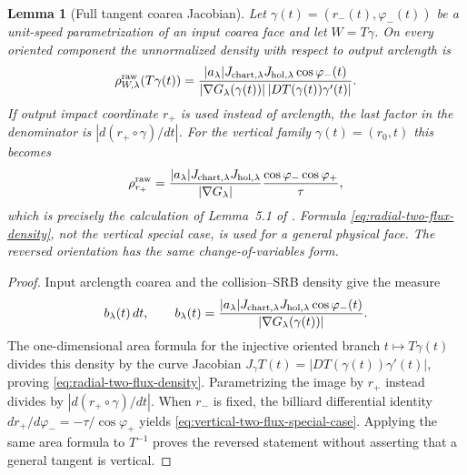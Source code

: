 \documentclass[11pt]{article}
\newtheorem{lemma}[theorem]{Lemma}
\begin{document}
\begin{lemma}[Full tangent coarea Jacobian]
\label{lem:two-flux-coarea}
Let $\gamma(t)=(r_-(t),\varphi_-(t))$ be a unit-speed parametrization of an
input coarea face and let $W=T\gamma$.  On every oriented component the
unnormalized density with respect to output arclength is
\begin{equation}
\label{eq:radial-two-flux-density}
 \rho^{\rm raw}_{W,\lambda}(T\gamma(t))=
 \frac{|a_\lambda|J_{{\rm chart},\lambda}J_{{\rm hol},\lambda}
       \cos\varphi_-(t)}
 {|\nabla G_\lambda(\gamma(t))|\,
       |D T(\gamma(t))\gamma'(t)|}.
\end{equation}
If output impact coordinate $r_+$ is used instead of arclength, the last
factor in the denominator is $|d(r_+\circ\gamma)/dt|$.  For the vertical
family $\gamma(t)=(r_0,t)$ this becomes
\begin{equation}
\label{eq:vertical-two-flux-special-case}
 \rho^{\rm raw}_{r_+}=
 \frac{|a_\lambda|J_{{\rm chart},\lambda}J_{{\rm hol},\lambda}}
 {|\nabla G_\lambda|}\frac{\cos\varphi_-\cos\varphi_+}{\tau},
\end{equation}
which is precisely the calculation of Lemma~5.1 of
\cite{CanestrariHoles}.  Formula \eqref{eq:radial-two-flux-density}, not the
vertical special case, is used for a general physical face.  The reversed
orientation has the same change-of-variables form.
\end{lemma}

\begin{proof}
Input arclength coarea and the collision--SRB density give the measure
\[
 b_\lambda(t)\,dt,
 \qquad b_\lambda(t)=
 \frac{|a_\lambda|J_{{\rm chart},\lambda}J_{{\rm hol},\lambda}
       \cos\varphi_-(t)}{|\nabla G_\lambda(\gamma(t))|}.
\]
The one-dimensional area formula for the injective oriented branch
$t\mapsto T\gamma(t)$ divides this density by the curve Jacobian
$J_\gamma T(t)=|DT(\gamma(t))\gamma'(t)|$, proving
\eqref{eq:radial-two-flux-density}.  Parametrizing the image by $r_+$ instead
divides by $|d(r_+\circ\gamma)/dt|$.  When $r_-$ is fixed, the billiard
differential identity
$dr_+/d\varphi_-=-\tau/\cos\varphi_+$ yields
\eqref{eq:vertical-two-flux-special-case}.  Applying the same area formula to
$T^{-1}$ proves the reversed statement without asserting that a general
tangent is vertical.
\end{proof}
\end{document}
